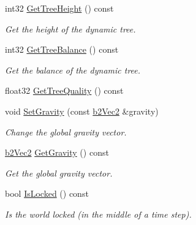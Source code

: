 \begin{DoxyCompactItemize}
\mbox{\label{classb2World_abc99b2beb6ba79ac6c80f33bac264b52}} 
int32 \mbox{\hyperlink{classb2World_abc99b2beb6ba79ac6c80f33bac264b52}{Get\+Tree\+Height}} () const
\begin{DoxyCompactList}\small\item\em Get the height of the dynamic tree. \end{DoxyCompactList}\item 
\mbox{\label{classb2World_aaca027331f06d93d978b44e065873f80}} 
int32 \mbox{\hyperlink{classb2World_aaca027331f06d93d978b44e065873f80}{Get\+Tree\+Balance}} () const
\begin{DoxyCompactList}\small\item\em Get the balance of the dynamic tree. \end{DoxyCompactList}\item 
float32 \mbox{\hyperlink{classb2World_a562935b3b8161dd18a467e02f479e88a}{Get\+Tree\+Quality}} () const
\item 
\mbox{\label{classb2World_aeafa43d6580e1dddb0675e672ca2375c}} 
void \mbox{\hyperlink{classb2World_aeafa43d6580e1dddb0675e672ca2375c}{Set\+Gravity}} (const \mbox{\hyperlink{structb2Vec2}{b2\+Vec2}} \&gravity)
\begin{DoxyCompactList}\small\item\em Change the global gravity vector. \end{DoxyCompactList}\item 
\mbox{\label{classb2World_abd41cdde8eaa3d1c58d2f00eaf688ec3}} 
\mbox{\hyperlink{structb2Vec2}{b2\+Vec2}} \mbox{\hyperlink{classb2World_abd41cdde8eaa3d1c58d2f00eaf688ec3}{Get\+Gravity}} () const
\begin{DoxyCompactList}\small\item\em Get the global gravity vector. \end{DoxyCompactList}\item 
\mbox{\label{classb2World_a71ca09a3082945a7e77f3f39fb021237}} 
bool \mbox{\hyperlink{classb2World_a71ca09a3082945a7e77f3f39fb021237}{Is\+Locked}} () const
\begin{DoxyCompactList}\small\item\em Is the world locked (in the middle of a time step). \end{DoxyCompactList}\item 

\end{DoxyCompactItemize}
